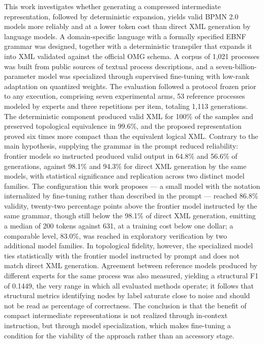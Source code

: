 This work investigates whether generating a compressed intermediate representation, followed by deterministic expansion, yields valid BPMN 2.0 models more reliably and at a lower token cost than direct XML generation by language models. A domain-specific language with a formally specified EBNF grammar was designed, together with a deterministic transpiler that expands it into XML validated against the official OMG schema. A corpus of 1,021 processes was built from public sources of textual process descriptions, and a seven-billion-parameter model was specialized through supervised fine-tuning with low-rank adaptation on quantized weights. The evaluation followed a protocol frozen prior to any execution, comprising seven experimental arms, 53 reference processes modeled by experts and three repetitions per item, totaling 1,113 generations. The deterministic component produced valid XML for 100\% of the samples and preserved topological equivalence in 99.6\%, and the proposed representation proved six times more compact than the equivalent logical XML. Contrary to the main hypothesis, supplying the grammar in the prompt reduced reliability: frontier models so instructed produced valid output in 64.8\% and 56.6\% of generations, against 98.1\% and 94.3\% for direct XML generation by the same models, with statistical significance and replication across two distinct model families. The configuration this work proposes — a small model with the notation internalized by fine-tuning rather than described in the prompt — reached 86.8\% validity, twenty-two percentage points above the frontier model instructed by the same grammar, though still below the 98.1\% of direct XML generation, emitting a median of 200 tokens against 631, at a training cost below one dollar; a comparable level, 83.0\%, was reached in exploratory verification by two additional model families. In topological fidelity, however, the specialized model ties statistically with the frontier model instructed by prompt and does not match direct XML generation. Agreement between reference models produced by different experts for the same process was also measured, yielding a structural F1 of 0.1449, the very range in which all evaluated methods operate; it follows that structural metrics identifying nodes by label saturate close to noise and should not be read as percentage of correctness. The conclusion is that the benefit of compact intermediate representations is not realized through in-context instruction, but through model specialization, which makes fine-tuning a condition for the viability of the approach rather than an accessory stage.

